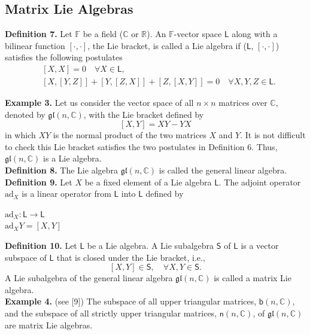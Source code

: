 \documentclass[11pt,a4paper]{article}
\begin{document}
\subsection{Matrix Lie Algebras}
\quad \textbf{ Definition 7.} Let $\mathbb{F}$ be a field ($\mathbb{C}$ or $\mathbb{R}$). An $\mathbb{F}$-vector space $\mathsf{L}$ along with a bilinear function $[\cdot,\cdot]$, the Lie bracket, is called a Lie algebra if ($\mathsf{L}$, $[\cdot,\cdot]$) satisfies the following postulates 
\begin{align*}
&[X,X] = 0 \quad \forall X \in \mathsf{L}, \\
&[X,[Y,Z]]+[Y,[Z,X]]+[Z,[X,Y]] = 0 \quad \forall X,Y,Z \in \mathsf{L}.
\end{align*}

\textbf{Example 3.} Let us consider the vector space of all $n \times n$ matrices over $\mathbb{C}$, denoted by $\mathfrak{gl}(n,\mathbb{C})$, with the Lie bracket defined by
$$
[X,Y] = XY - YX
$$
in which $XY$ is the normal product of the two matrices $X$ and $Y$. It is not difficult to check this Lie bracket satisfies the two postulates in Definition 6. Thus, $\mathfrak{gl}(n,\mathbb{C})$ is a Lie algebra.\\

\textbf{Definition 8.} The Lie algebra $\mathfrak{gl}(n,\mathbb{C})$ is called the general linear algebra.
\\

\textbf{Definition 9.} Let $X$ be a fixed element of a Lie algebra $\mathsf{L}$. The adjoint operator $\mathrm{ad}_X$ is a linear operator from $\mathsf{L}$ into $\mathsf{L}$ defined by
\begin{center}
$\mathrm{ad}_X: \mathsf{L} \longrightarrow \mathsf{L}$ \\
$\mathrm{ad}_X Y = [X,Y]$
\end{center}

\textbf{Definition 10.} Let $\mathsf{L}$ be a Lie algebra. A Lie subalgebra $\mathsf{S}$ of $\mathsf{L}$ is a vector subspace of $\mathsf{L}$ that is closed under the Lie bracket, i.e.,
$$
[X,Y] \in \mathsf{S}, \quad \forall X, Y \in \mathsf{S}.
$$ 
A Lie subalgebra of the general linear algebra $\mathfrak{gl}(n,\mathbb{C})$ is called a matrix Lie algebra.\\

\textbf{Example 4.} (see [9]) The subspace of all upper triangular matrices, $\mathsf{b}(n,\mathbb{C})$, and the subspace of all strictly upper triangular matrices, $\mathsf{n}(n,\mathbb{C})$, of $\mathfrak{gl}(n,\mathbb{C})$ are matrix Lie algebras.\\
\end{document}
